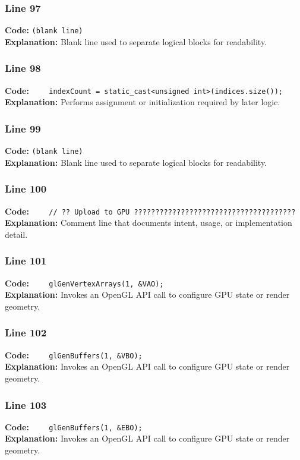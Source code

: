 \documentclass[11pt,a4paper]{article}
\begin{document}
\subsubsection*{Line 97}
\textbf{Code:} \texttt{(blank line)}\\
\textbf{Explanation:} Blank line used to separate logical blocks for readability.

\subsubsection*{Line 98}
\textbf{Code:} \verb|    indexCount = static_cast<unsigned int>(indices.size());|\\
\textbf{Explanation:} Performs assignment or initialization required by later logic.

\subsubsection*{Line 99}
\textbf{Code:} \texttt{(blank line)}\\
\textbf{Explanation:} Blank line used to separate logical blocks for readability.

\subsubsection*{Line 100}
\textbf{Code:} \verb|    // ?? Upload to GPU ??????????????????????????????????????|\\
\textbf{Explanation:} Comment line that documents intent, usage, or implementation detail.

\subsubsection*{Line 101}
\textbf{Code:} \verb|    glGenVertexArrays(1, &VAO);|\\
\textbf{Explanation:} Invokes an OpenGL API call to configure GPU state or render geometry.

\subsubsection*{Line 102}
\textbf{Code:} \verb|    glGenBuffers(1, &VBO);|\\
\textbf{Explanation:} Invokes an OpenGL API call to configure GPU state or render geometry.

\subsubsection*{Line 103}
\textbf{Code:} \verb|    glGenBuffers(1, &EBO);|\\
\textbf{Explanation:} Invokes an OpenGL API call to configure GPU state or render geometry.
\end{document}
